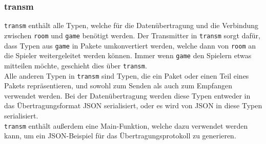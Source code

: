 \subsubsection{transm}
\verb+transm+ enthält alle Typen, welche für die Datenübertragung und die Verbindung zwischen \verb+room+ und \verb+game+ benötigt werden.
Der Transmitter in \verb+transm+ sorgt dafür, dass Typen aus \verb+game+ in Pakete umkonvertiert werden, welche dann von \verb+room+ an die Spieler weitergeleitet werden können. Immer wenn \verb+game+ den Spielern etwas mitteilen möchte, geschieht dies über \verb+transm+. \\
Alle anderen Typen in \verb+transm+ sind Typen, die ein Paket oder einen Teil eines Pakets repräsentieren, und sowohl zum Senden als auch zum Empfangen verwendet werden. Bei der Datenübertragung werden diese Typen entweder in das Übertragungsformat JSON serialisiert, oder es wird von JSON in diese Typen serialisiert. \\
\verb+transm+ enthält außerdem eine Main-Funktion, welche dazu verwendet werden kann, um ein JSON-Beispiel für das Übertragungsprotokoll zu generieren.

